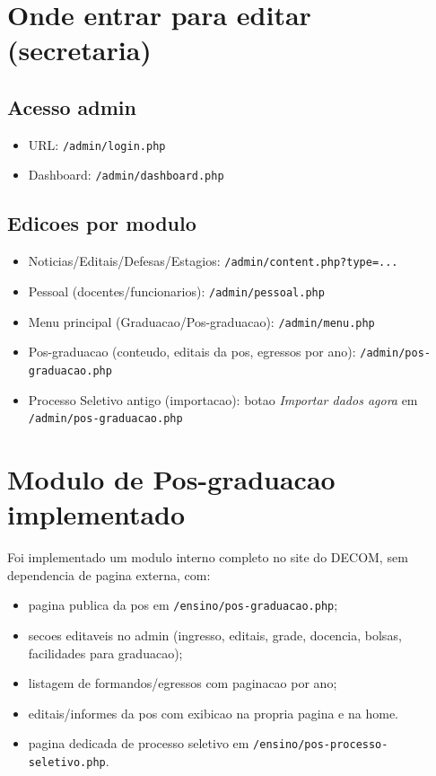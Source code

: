 \documentclass[12pt,a4paper]{article}
\begin{document}
\section{Onde entrar para editar (secretaria)}
\subsection{Acesso admin}
\begin{itemize}
    \item URL: \texttt{/admin/login.php}
    \item Dashboard: \texttt{/admin/dashboard.php}
\end{itemize}

\subsection{Edicoes por modulo}
\begin{itemize}
    \item Noticias/Editais/Defesas/Estagios: \texttt{/admin/content.php?type=...}
    \item Pessoal (docentes/funcionarios): \texttt{/admin/pessoal.php}
    \item Menu principal (Graduacao/Pos-graduacao): \texttt{/admin/menu.php}
    \item Pos-graduacao (conteudo, editais da pos, egressos por ano): \texttt{/admin/pos-graduacao.php}
    \item Processo Seletivo antigo (importacao): botao \textit{Importar dados agora} em \texttt{/admin/pos-graduacao.php}
\end{itemize}

\section{Modulo de Pos-graduacao implementado}
Foi implementado um modulo interno completo no site do DECOM, sem dependencia de pagina externa, com:
\begin{itemize}
    \item pagina publica da pos em \texttt{/ensino/pos-graduacao.php};
    \item secoes editaveis no admin (ingresso, editais, grade, docencia, bolsas, facilidades para graduacao);
    \item listagem de formandos/egressos com paginacao por ano;
    \item editais/informes da pos com exibicao na propria pagina e na home.
    \item pagina dedicada de processo seletivo em \texttt{/ensino/pos-processo-seletivo.php}.
\end{itemize}
\end{document}
